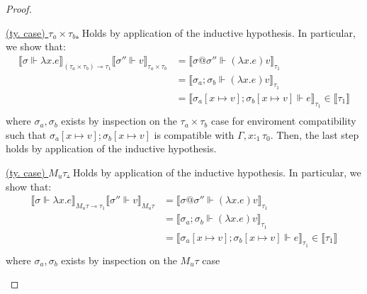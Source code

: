 \begin{proof}
\begin{description}
\begin{description}
      \item{\underline{(ty. case) $\tau_a \times \tau_b$.}} 
        Holds by application of the inductive hypothesis. 
        In particular, we show that:
        \begin{equation*}
          \begin{aligned}
            \llbracket \sigma \Vdash \lambda x . e \rrbracket_{(\tau_a \times
            \tau_b) \multimap \tau_1} \llbracket \sigma'' \Vdash v
            \rrbracket_{\tau_a \times \tau_b} &=
            \llbracket \sigma @ \sigma'' \Vdash (\lambda x . e) v
            \rrbracket_{\tau_1} \\
            &=
            \llbracket \sigma_a; \sigma_b \Vdash (\lambda x . e) v
            \rrbracket_{\tau_1} \\
            & =
            \llbracket \sigma_a[x \mapsto v]; \sigma_b[x \mapsto v] \Vdash e
            \rrbracket_{\tau_1} \in \llbracket \tau_1 \rrbracket \\
          \end{aligned}
        \end{equation*}
        where $\sigma_a, \sigma_b$ exists by inspection on the $\tau_a \times
        \tau_b$ case for enviroment compatibility such that $\sigma_a[x \mapsto
        v]; \sigma_b[x \mapsto v]$ is compatible with $\Gamma, x :_1 \tau_0$.
        Then, the last step holds by application of the inductive hypothesis.
      \item{\underline{(ty. case) $M_u \tau$.}} 
        Holds by application of the inductive hypothesis. 
        In particular, we show that:
        \begin{equation*}
          \begin{aligned}
            \llbracket \sigma \Vdash \lambda x . e \rrbracket_{M_u \tau \multimap \tau_1} \llbracket \sigma'' \Vdash v
            \rrbracket_{M_u \tau} &=
            \llbracket \sigma @ \sigma'' \Vdash (\lambda x . e) v
            \rrbracket_{\tau_1} \\
            &=
            \llbracket \sigma_a; \sigma_b \Vdash (\lambda x . e) v
            \rrbracket_{\tau_1} \\
            & =
            \llbracket \sigma_a[x \mapsto v]; \sigma_b[x \mapsto v] \Vdash e
            \rrbracket_{\tau_1} \in \llbracket \tau_1 \rrbracket \\
          \end{aligned}
        \end{equation*}
        where $\sigma_a, \sigma_b$ exists by inspection on the $M_u \tau$ case

\end{description}
\end{description}
\end{proof}
